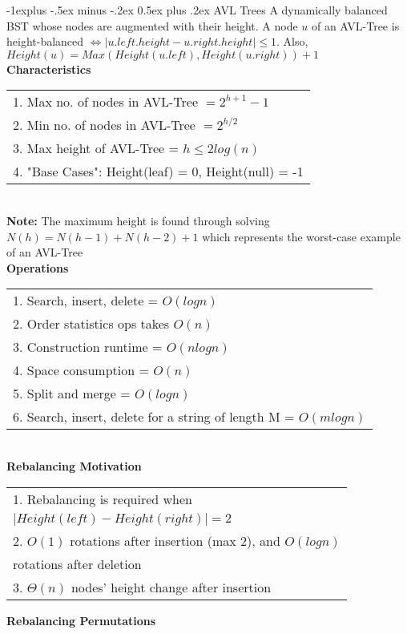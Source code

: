 \documentclass[10pt,landscape]{article}
\makeatletter
\renewcommand{\subsection}{\@startsection{subsection}{2}{0mm}%
                                {-1explus -.5ex minus -.2ex}%
                                {0.5ex plus .2ex}%
                                {\normalfont\normalsize\bfseries}}
\makeatother
\begin{document}
\begin{multicols}{3}
\subsection{AVL Trees} 
A dynamically balanced BST whose nodes are augmented with their height. A node $u$ of an AVL-Tree is height-balanced $\iff \lvert u.left.height - u.right.height \rvert \leq 1$. Also, $Height(u) = Max(Height(u.left), Height(u.right)) + 1$ \\ 
\textbf{Characteristics} \\
\begin{tabular}{l}
1. Max no. of nodes in AVL-Tree $ = 2^{h+1} - 1$ \\ 
2. Min no. of nodes in AVL-Tree $ = 2^{h/2}$ \\ 
3. Max height of AVL-Tree = $h \leq 2log(n)$ \\ 
4. "Base Cases": Height(leaf) = 0, Height(null) = -1 \\ 
\end{tabular} \\
\textbf{Note:} The maximum height is found through solving $N(h) = N(h-1) + N(h-2) + 1$ which represents the worst-case example of an AVL-Tree \\ 
\textbf{Operations} 
\begin{tabular}{l} 
1. Search, insert, delete = $O(logn)$ \\ 
2. Order statistics ops takes $O(n)$ \\ 
3. Construction runtime = $O(nlogn)$ \\ 
4. Space consumption = $O(n)$ \\ 
5. Split and merge = $O(logn)$ \\ 
6. Search, insert, delete for a string of length M = $O(mlogn)$ \\ 
\end{tabular} \\ 
\textbf{Rebalancing Motivation} \\ 
\begin{tabular}{l} 
1. Rebalancing is required when \\ $\lvert Height(left) - Height(right) \rvert = 2$ \\ 
2. $O(1)$ rotations after insertion (max 2), and $O(logn)$ \\ rotations after deletion \\ 
3. $\Theta(n)$ nodes' height change after insertion \\ 
\end{tabular}
\textbf{Rebalancing Permutations} \\ 

\end{multicols}
\end{document}
